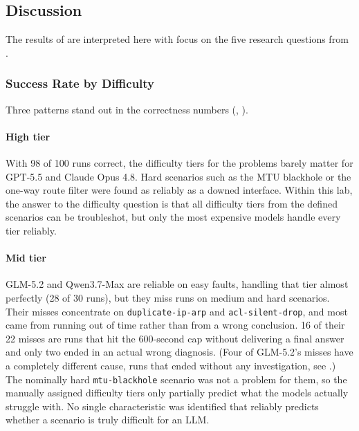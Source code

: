 \subsection{Discussion}
\label{sec:discussion}

The results of  are interpreted here with focus on the five research
questions from .

\subsubsection{Success Rate by Difficulty}
\label{sec:discussion-success}

Three patterns stand out in the correctness numbers
(, ).

\paragraph{High tier} With 98 of 100 runs correct, the
difficulty tiers for the problems barely matter for GPT-5.5 and Claude Opus 4.8. Hard scenarios such as the MTU
blackhole or the one-way route filter were found as reliably as a downed interface. Within this
lab, the answer to the difficulty question is that all difficulty tiers from the defined scenarios can be
troubleshot, but only the most expensive models handle every tier reliably.

\paragraph{Mid tier} GLM-5.2 and
Qwen3.7-Max are reliable on easy faults, handling that tier almost perfectly (28 of 30 runs),
but they miss runs on medium and hard scenarios. Their misses concentrate on \texttt{duplicate-ip-arp} and
\texttt{acl-silent-drop}, and most came from running out of time rather than from a
wrong conclusion. 16 of their 22 misses are runs that hit the 600-second cap without
delivering a final answer and only two ended in an actual wrong diagnosis. (Four of GLM-5.2's
misses have a completely different cause, runs that ended without any investigation, see
.)
The nominally hard
\texttt{mtu-blackhole} scenario was not a problem for them, so the manually
assigned difficulty tiers only partially predict what the models actually struggle with.
No single characteristic was identified that reliably predicts whether a scenario is truly difficult for an LLM.


